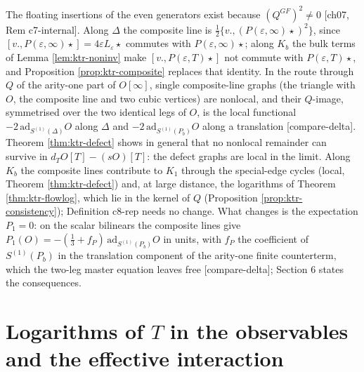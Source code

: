 \begin{remark}
\label{rem:ktr-mechanism}
The floating insertions of the even generators exist because $(Q^{GF})^2\neq0$ [ch07, Rem c7-internal]. Along $\Delta$ the composite line is $\tfrac12\{v.,(P(\varepsilon,\infty)\star)^2\}$, since $[v.,P(\varepsilon,\infty)\star]=4\varepsilon L_\varepsilon\star$ commutes with $P(\varepsilon,\infty)\star$; along $K_b$ the bulk terms of Lemma \ref{lem:ktr-noninv} make $[v.,P(\varepsilon,T)\star]$ not commute with $P(\varepsilon,T)\star$, and Proposition \ref{prop:ktr-composite} replaces that identity. In the route through $Q$ of the arity-one part of $O[\infty]$, single composite-line graphs (the triangle with $O$, the composite line and two cubic vertices) are nonlocal, and their $Q$-image, symmetrised over the two identical legs of $O$, is the local functional $-2\,\mathrm{ad}_{S^{(1)}(\Delta)}O$ along $\Delta$ and $-2\,\mathrm{ad}_{S^{(1)}(P_b)}O$ along a translation [compare-delta]. Theorem \ref{thm:ktr-defect} shows in general that no nonlocal remainder can survive in $d_TO[T]-(sO)[T]$: the defect graphs are local in the limit. Along $K_b$ the composite lines contribute to $K_1$ through the special-edge cycles (local, Theorem \ref{thm:ktr-defect}) and, at large distance, the logarithms of Theorem \ref{thm:ktr-flowlog}, which lie in the kernel of $Q$ (Proposition \ref{prop:ktr-consistency}); Definition c8-rep needs no change. What changes is the expectation $P_1=0$: on the scalar bilinears the composite lines give $P_1(O)=-(\tfrac13+f_P)\,\mathrm{ad}_{S^{(1)}(P_b)}O$ in units, with $f_P$ the coefficient of $S^{(1)}(P_b)$ in the translation component of the arity-one finite counterterm, which the two-leg master equation leaves free [compare-delta]; Section 6 states the consequences.
\end{remark}

\section{Logarithms of $T$ in the observables and the effective interaction}

